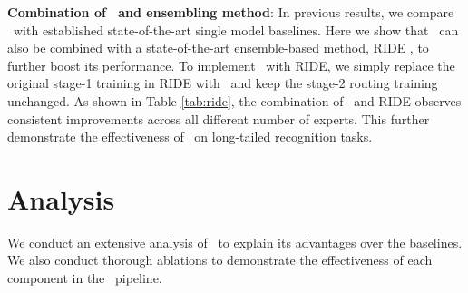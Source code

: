 \begin{table}[h]
\caption{Top-1 accuracy on ImageNet-LT with ResNet-50. Combination of \name~and state-of-the-art ensemble-based method RIDE \cite{wang2020long} can further improve its performance.}
\vspace{-5mm}
\label{tab:ride}
\begin{center}
\end{center}
\vspace{-20pt}
\end{table}

\textbf{Combination of \name~and ensembling method}: In previous results, we compare \name~with established state-of-the-art single model baselines. Here we show that \name~can also be combined with a state-of-the-art ensemble-based method, RIDE \cite{wang2020long}, to further boost its performance. To implement \name~with RIDE, we simply replace the original stage-1 training in RIDE with \name~and keep the stage-2 routing training unchanged. As shown in Table \ref{tab:ride}, the combination of \name~and RIDE observes consistent improvements across all different number of experts. This further demonstrate the effectiveness of \name~on long-tailed recognition tasks.

\section{Analysis}
\label{sec:analysis}
We conduct an extensive analysis of \name~to explain its advantages over the baselines. We also conduct thorough ablations to demonstrate the effectiveness of each component in the \name~pipeline. 

